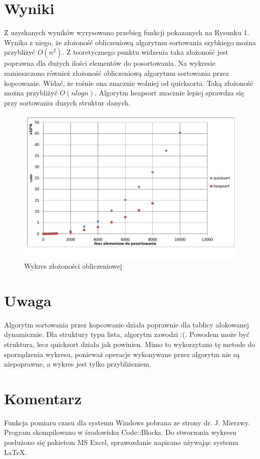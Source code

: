 \documentclass[11pt,a4paper]{article}
\begin{document}
\section{Wyniki}
Z uzyskanych wyników wyrysowano przebieg funkcji pokazanych na Rysunku 1. Wynika z niego, że złożoność obliczeniową algorytmu sortowania szybkiego można przybliżyć $O(n^{2})$. Z teoretycznego punktu widzenia taka złożoność jest poprawna dla dużych ilości elementów do posortowania. Na wykresie zamieszczono również złożoność obliczeniową algorytmu sortowania przez kopcowanie. Widać, że rośnie ona znacznie wolniej od quicksorta. Taką złożoność można przybliżyć $O(n logn)$. Algorytm heapsort znacznie lepiej sprawdza się przy sortowaniu duzych struktur danych.
\begin{figure}[t!]
\centering
\includegraphics[scale=0.75]{wykres1.pdf}
\caption{Wykres złożoności obliczeniowej}
\label{fig:wykres1}
\end{figure}
\section{Uwaga}
Algorytm sortowania przez kopcowanie działa poprawnie dla tablicy alokowanej dynamicznie. Dla struktury typu lista, algorytm zawodzi :(. Powodem może być struktura, lecz quicksort działa jak powinien. Mimo to wykorzytano tę metode do sporządzenia wykresu, ponieważ operacje wykonywane przez algorytm nie są niepoprawne, a wykres jest tylko przybliżeniem.
\section{Komentarz}
Funkcja pomiaru czasu dla systemu Windows pobrana ze strony dr. J. Mierzwy. Program skompilowano w środowisku Code::Blocks. Do stworzonia wykresu posłużono się pakietem MS Excel, sprawozdanie napisano używając systemu \LaTeX.
\end{document}
